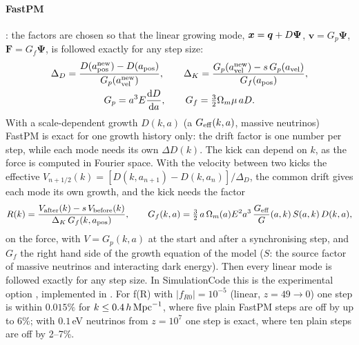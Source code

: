 \paragraph*{FastPM} \cite{Feng2016}: the factors are chosen so that the linear growing mode, $\bm{x}=\bm{q}+D\bm\Psi$,
$\bm v=G_p\bm\Psi$, $\bm F=G_f\bm\Psi$, is followed exactly for any step size:
\begin{gather}
\Delta_D=\frac{D(a_{\rm pos}^{\rm new})-D(a_{\rm pos})}{G_p(a_{\rm vel}^{\rm new})},\qquad
\Delta_K=\frac{G_p(a_{\rm vel}^{\rm new})-s\,G_p(a_{\rm vel})}{G_f(a_{\rm pos})},\\
G_p=a^3E\frac{\mathrm{d} D}{\mathrm{d} a},\qquad G_f=\tfrac32\Omega_m\mu\,aD .
\end{gather}
With a scale-dependent growth $D(k,a)$ (a $G_{\rm eff}(k,a)$, massive neutrinos) FastPM is exact for one growth
history only: the drift factor is one number per step, while each mode needs its own $\Delta D(k)$. The kick can
depend on $k$, as the force is computed in Fourier space. With the velocity between two kicks the effective
$V_{n+1/2}(k)=[D(k,a_{n+1})-D(k,a_n)]/\Delta_D$, the common drift gives each mode its own growth, and the kick needs the
factor
\begin{equation}
R(k)=\frac{V_{\rm after}(k)-s\,V_{\rm before}(k)}{\Delta_K\,G_f(k,a_{\rm pos})},\qquad
G_f(k,a)=\tfrac32\,a\,\Omega_m(a)E^2a^3\,\frac{G_{\rm eff}}{G}(a,k)\,S(a,k)\,D(k,a),
\end{equation}
on the force, with $V=G_p(k,a)$ at the start and after a synchronising step, and $G_f$ the right hand side of the
growth equation of the model ($S$: the source factor of massive neutrinos and interacting dark energy). Then every
linear mode is followed exactly for any step size. In SimulationCode this is the experimental option
, implemented in . For f(R) with $|f_{R0}|=10^{-5}$ (linear, $z=49\to0$) one step is
within $0.015\%$ for $k\le0.4\,h\,\mathrm{Mpc}^{-1}$, where five plain FastPM steps are off by up to $6\%$; with $0.1$\,eV neutrinos
from $z=10^7$ one step is exact, where ten plain steps are off by 2--7\%.

